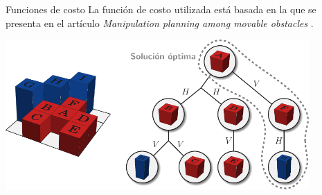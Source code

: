 \documentclass[14pt, aspectratio = 1610, xcolor=table, structureblod]{beamer}
\let\oldcite\cite
\def\cite#1{\textcolor{verdeMedio}{\oldcite{#1}}}
\begin{document}
\begin{frame}{Funciones de costo}
	La función de costo utilizada está basada en la que se presenta en el artículo \textsl{Manipulation planning among movable obstacles} \cite{4209604}.
	
	\centering	
	\includegraphics[width = 0.87\textwidth]{arbol}
\end{frame}
\end{document}
